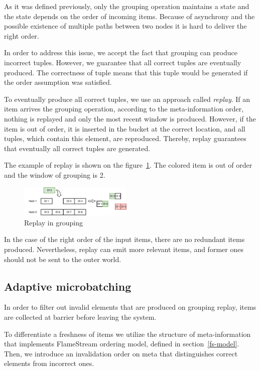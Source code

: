 \label {fs-collision}

As it was defined previously, only the grouping operation maintains a state and the state depends on the order of incoming items. Because of asynchrony and the possible existence of multiple paths between two nodes it is hard to deliver the right order.

In order to address this issue, we accept the fact that grouping can produce incorrect tuples. However, we guarantee that all correct tuples are eventually produced. The correctness of tuple means that this tuple would be generated if the order assumption was satisfied. 

To eventually produce all correct tuples, we use an approach called {\it replay}. If an item arrives the grouping operation, according to the meta-information order, nothing is replayed and only the most recent window is produced. However, if the item is out of order, it is inserted in the bucket at the correct location, and all tuples, which contain this element, are reproduced. Thereby, replay guarantees that eventually all correct tuples are generated.

The example of replay is shown on the figure~\ref{grouping-replaying-figure}. The colored item is out of order and the window of grouping is 2.

\begin{figure}[htbp]
  \centering
  \includegraphics[width=0.48\textwidth]{pics/grouping-replaying}
  \caption{Replay in grouping}
  \label {grouping-replaying-figure}
\end{figure}

In the case of the right order of the input items, there are no redundant items produced. Nevertheless, replay can emit more relevant items, and former ones should not be sent to the outer world.

\subsection{Adaptive microbatching}
In order to filter out invalid elements that are produced on grouping replay, items are collected at barrier before leaving the system.

To differentiate a freshness of items we utilize the structure of meta-information that implements FlameStream ordering model, defined in section~\ref{fs-model}. Then, we introduce an invalidation order on meta that distinguishes correct elements from incorrect ones.

